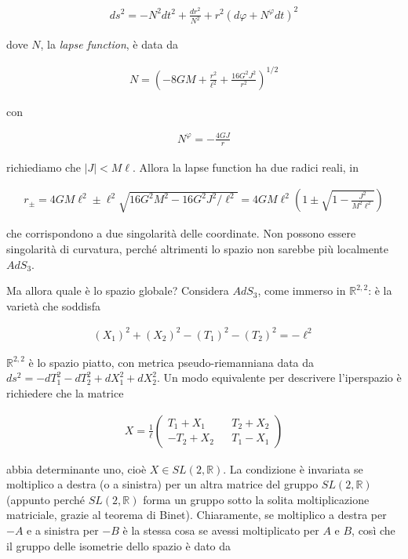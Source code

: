 \documentclass{report}
\begin{document}
\begin{align}
    ds^2 = -N^2dt^2 + \frac{dr^2}{N^2} + r^2(d\varphi + N^\varphi dt)^2
\end{align}

dove \(N\), la \emph{lapse function}, è data da 

\begin{align}
    N = \left(-8GM + \frac{r^2}{\ell^2} + \frac{16 G^2 J^2}{r^2} \right)^{1/2}
\end{align}

con 

\begin{align}
    N^\varphi = -\frac{4G J}{r}
\end{align}

richiediamo che \(|J| < M\ell\). Allora la lapse function ha due radici reali, in 

\begin{align}
    r_{\pm} = 4GM \ell^2\pm \ell^2\sqrt{16G^2M^2 - 16 G^2 J^2/\ell^2} = 4GM\ell^2\left(1 \pm \sqrt{1 - \frac{J^2}{M^2\ell^2}}\right)
\end{align}

che corrispondono a due singolarità delle coordinate. Non possono essere singolarità di curvatura, perché altrimenti lo spazio non sarebbe più localmente \(AdS_3\). 

Ma allora quale è lo spazio globale? Considera \(AdS_3\), come immerso in \(\mathbb{R}^{2, 2}\): è la varietà che soddisfa 

\begin{align}
    (X_1)^2 + (X_2)^2 - (T_1)^2 - (T_2)^2 = -\ell^2 
\end{align}

\(\mathbb{R}^{2,2}\) è lo spazio piatto, con metrica pseudo-riemanniana data da \(ds^2 = -dT_1^2 - dT_2^2 + dX_1^2 + dX_2^2\). Un modo equivalente per descrivere l'iperspazio è richiedere che la matrice 

\begin{align}
    X = \frac{1}{\ell}\begin{pmatrix}
        T_1 + X_1 && T_2 + X_2 \\
        -T_2 + X_2 && T_1 - X_1
    \end{pmatrix}
\end{align}

abbia determinante uno, cioè \(X \in SL(2, \mathbb{R})\). La condizione è invariata se moltiplico a destra (o a sinistra) per un altra matrice del gruppo \(SL(2, \mathbb{R})\) (appunto perché \(SL(2, \mathbb{R})\) forma un gruppo sotto la solita moltiplicazione matriciale, grazie al teorema di Binet). Chiaramente, se moltiplico a destra per \(-A\) e a sinistra per \(-B\) è la stessa cosa se avessi moltiplicato per \(A\) e \(B\), così che il gruppo delle isometrie dello spazio è dato da 
\end{document}
